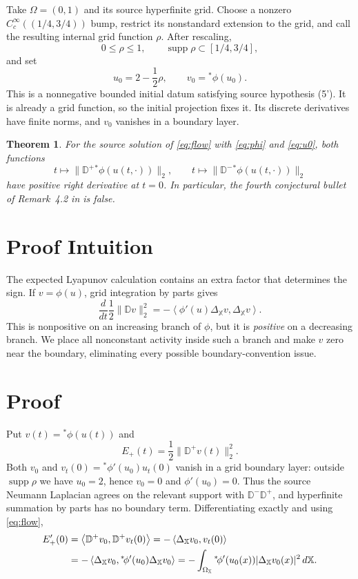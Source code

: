 \documentclass[10pt]{article}
\newtheorem{theorem}{Theorem}
\newcommand{\DX}{\Delta_{\mathbb X}}
\newcommand{\Dp}{\mathbb D^+}
\newcommand{\Dm}{\mathbb D^-}
\newcommand{\ip}[2]{\left\langle #1,#2\right\rangle}
\begin{document}
Take $\Omega=(0,1)$ and its source hyperfinite grid.  Choose a nonzero
$C_c^\infty((1/4,3/4))$ bump, restrict its nonstandard extension to the
grid, and call the resulting internal grid function $\rho$.  After rescaling,
\[
 0\leq\rho\leq1,
 \qquad \operatorname{supp}\rho\subset[1/4,3/4],
\]
and set
\begin{equation}\label{eq:u0}
 u_0=2-\frac12\rho,\qquad v_0={}^*\!\phi(u_0).
\end{equation}
This is a nonnegative bounded initial datum satisfying source hypothesis
(5').  It is already a grid function, so the initial projection fixes it.
Its discrete derivatives have finite norms, and $v_0$ vanishes in a boundary
layer.

\begin{theorem}\label{thm:counterexample}
For the source solution of \eqref{eq:flow} with \eqref{eq:phi} and
\eqref{eq:u0}, both functions
\[
 t\longmapsto\|\Dp{}^*\!\phi(u(t,\cdot))\|_2,
 \qquad
 t\longmapsto\|\Dm{}^*\!\phi(u(t,\cdot))\|_2
\]
have positive right derivative at $t=0$.  In particular, the fourth
conjectural bullet of Remark~4.2 in \cite{Bottazzi} is false.
\end{theorem}

\section*{Proof Intuition}

The expected Lyapunov calculation contains an extra factor that determines
the sign.  If $v=\phi(u)$, grid integration by parts gives
\[
 \frac{d}{dt}\frac12\|\mathbb Dv\|_2^2
 =-\ip{\phi'(u)\DX v}{\DX v}.
\]
This is nonpositive on an increasing branch of $\phi$, but it is
\emph{positive} on a decreasing branch.  We place all nonconstant activity
inside such a branch and make $v$ zero near the boundary, eliminating every
possible boundary-convention issue.

\section*{Proof}

Put $v(t)={}^*\!\phi(u(t))$ and
\[
 E_+(t)=\frac12\|\Dp v(t)\|_2^2.
\]
Both $v_0$ and
$v_t(0)={}^*\!\phi'(u_0)u_t(0)$ vanish in a grid boundary layer: outside
$\operatorname{supp}\rho$ we have $u_0=2$, hence $v_0=0$ and
$\phi'(u_0)=0$.  Thus the source Neumann Laplacian agrees on the relevant
support with $\Dm\Dp$, and hyperfinite summation by parts has no boundary
term.  Differentiating exactly and using \eqref{eq:flow},
\begin{align}
 E_+'(0)
 &=\ip{\Dp v_0}{\Dp v_t(0)}
   =-\ip{\DX v_0}{v_t(0)} \notag\\
 &=-\ip{\DX v_0}{{}^*\!\phi'(u_0)\DX v_0}
   =-\int_{\Omega_{\mathbb X}}
       {}^*\!\phi'(u_0(x))|\DX v_0(x)|^2\,d\mathbb X.
 \label{eq:energy}
\end{align}
\end{document}

